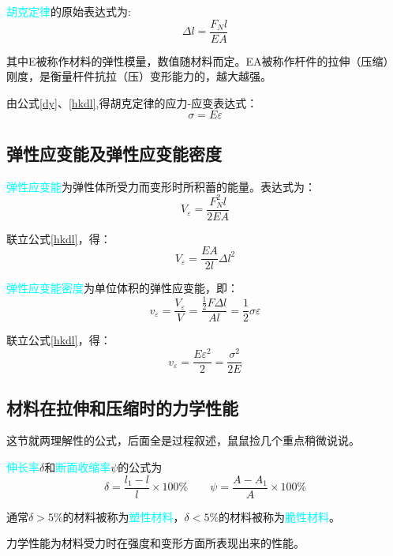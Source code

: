 \documentclass[10pt,a4paper]{ctexart}
\begin{document}
\textcolor{cyan}{胡克定律}的原始表达式为:
\begin{equation}
\Delta l=\frac{F_N l}{EA}
\label{hkdl}
\end{equation}

其中E被称作材料的弹性模量，数值随材料而定。EA被称作杆件的拉伸（压缩）刚度，是衡量杆件抗拉（压）变形能力的，越大越强。

由公式\ref{dy}、\ref{hkdl},得胡克定律的应力-应变表达式：
\begin{equation}
\sigma=E\varepsilon
\end{equation}
\subsection{弹性应变能及弹性应变能密度}
\textcolor{cyan}{弹性应变能}为弹性体所受力而变形时所积蓄的能量。表达式为：
\begin{equation}
	V_{\varepsilon}=\frac{F^2_N l}{2EA}
\end{equation}

联立公式\ref{hkdl}，得：
\begin{equation}
	V_{\varepsilon}=\frac{EA}{2l}\Delta l^2
\end{equation}

\textcolor{cyan}{弹性应变能密度}为单位体积的弹性应变能，即：
\begin{equation}
	v_{\varepsilon}=\frac{V_{\varepsilon}}{V}=\frac{\frac{1}{2}F\Delta l}{Al}=\frac{1}{2}\sigma\varepsilon
\end{equation}

联立公式\ref{hkdl}，得：
\begin{equation}
	v_{\varepsilon}=\frac{E\varepsilon^2}{2}=\frac{\sigma^2}{2E}
\end{equation}
	 
\subsection{材料在拉伸和压缩时的力学性能}
这节就两理解性的公式，后面全是过程叙述，鼠鼠捡几个重点稍微说说。

\textcolor{cyan}{伸长率}$\delta$和\textcolor{cyan}{断面收缩率}$\psi$的公式为
\begin{equation}
	\delta=\frac{l_1-l}{l}\times 100\% \qquad \psi=\frac{A-A_1}{A}\times 100\%
\end{equation}

通常$\delta>5\%$的材料被称为\textcolor{cyan}{塑性材料}，$\delta<5\%$的材料被称为\textcolor{cyan}{脆性材料}。

力学性能为材料受力时在强度和变形方面所表现出来的性能。
\end{document}
